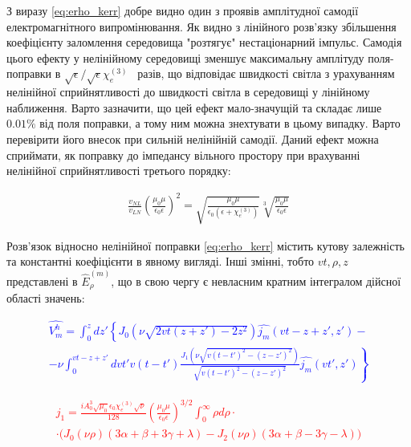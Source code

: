 З виразу \eqref{eq:erho_kerr} добре видно один з проявів амплітудної
самодії електромагнітного випромінювання. Як видно з лінійного розв'язку
збільшення коефіцієнту заломлення середовища "розтягує" нестаціонарний 
імпульс. Самодія цього ефекту у нелінійному середовищі зменшує 
максимальну амплітуду поля-поправки в 
$ \sqrt{\epsilon} / \sqrt{\epsilon} \chi_e^{(3)} $  разів, що відповідає 
швидкості світла з урахуванням нелінійної сприйнятливості до швидкості 
світла в середовищі у лінійному наближення. Варто зазначити, що цей ефект 
мало-значущій та складає лише $ 0.01\% $ від поля поправки, а тому ним 
можна знехтувати в цьому випадку. Варто перевірити його внесок при сильній 
нелінійній самодії. Даний ефект можна сприймати, як поправку до імпедансу 
вільного простору при врахуванні нелінійної сприйнятливості третього порядку:

\begin{equation*} \begin{aligned}
\frac{v_{NL}}{v_{LN}}
\left( \frac{\mu_0 \mu}{\epsilon_0 \epsilon} \right)^2 = 
\sqrt{\frac{\mu_0 \mu}{\epsilon_0 \left( \epsilon + \chi_e^{(3)} \right)}}
\sqrt[3]{\frac{\mu_0 \mu}{\epsilon_0 \epsilon}} 
\end{aligned} \end{equation*}

Розв'язок відносно нелінійної поправки \eqref{eq:erho_kerr} містить кутову 
залежність та константні коефіцієнти в явному вигляді. Інші змінні, тобто
$ vt, \rho, z $ представлені в $ \hat{E}_\rho^{(m)} $, що в свою чергу
є невласним кратним інтегралом дійсної області значень:

\textcolor{blue} { \begin{equation*} \begin{aligned}
\hat{V_m^h} = \int_0^z dz' 
\left\{ J_0 \left( \nu \sqrt{2 vt (z + z') - 2 z^2} \right) 
\hat{j_m} (vt - z + z',z') - \right. \\ 
\left. - \nu \int_0^{vt - z + z'} dvt' v (t-t') 
\frac{J_1 \left( \nu \sqrt{v(t-t')^2 - (z-z')^2} \right)}
{\sqrt{v(t-t')^2 - (z-z')^2}} \hat{j_m} (vt',z')  \right\}
\end{aligned} \end{equation*} }

\textcolor{red} { \begin{equation*} \begin{aligned}
j_1 = \frac{i A_0^3 \sqrt{\mu_0} \epsilon_0 \chi_e^{(3)} \sqrt{\nu}}{128}
\left( \frac{\mu_0 \mu}{\epsilon_0 \epsilon} \right)^{3/2}
\int_0^\infty \rho d \rho \cdot \\ \cdot
\Big( J_0 (\nu \rho) ( 3 \alpha + \beta + 3 \gamma + \lambda) - J_2 (\nu \rho)
( 3 \alpha + \beta - 3 \gamma - \lambda ) \Big)
\end{aligned} \end{equation*} }

